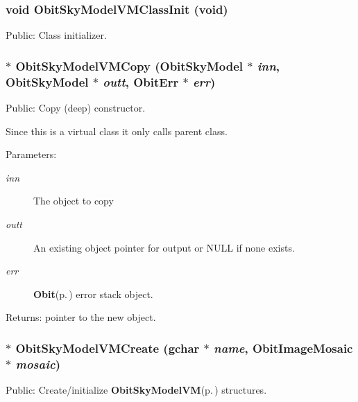 \subsubsection{\setlength{\rightskip}{0pt plus 5cm}void Obit\-Sky\-Model\-VMClass\-Init (void)}\label{ObitSkyModelVM_8h_a4}


Public: Class initializer. 

\subsubsection{$\ast$ Obit\-Sky\-Model\-VMCopy ({\bf Obit\-Sky\-Model} $\ast$ {\em inn}, {\bf Obit\-Sky\-Model} $\ast$ {\em outt}, {\bf Obit\-Err} $\ast$ {\em err})}\label{ObitSkyModelVM_8h_a12}


Public: Copy (deep) constructor. 

Since this is a virtual class it only calls parent class. \begin{Desc}
\item[Parameters:]
\begin{description}
\item[{\em inn}]The object to copy \item[{\em outt}]An existing object pointer for output or NULL if none exists. \item[{\em err}]{\bf Obit}{\rm (p.\,\pageref{structObit})} error stack object. \end{description}
\end{Desc}
\begin{Desc}
\item[Returns:]pointer to the new object. \end{Desc}
\subsubsection{$\ast$ Obit\-Sky\-Model\-VMCreate (gchar $\ast$ {\em name}, {\bf Obit\-Image\-Mosaic} $\ast$ {\em mosaic})}\label{ObitSkyModelVM_8h_a6}


Public: Create/initialize {\bf Obit\-Sky\-Model\-VM}{\rm (p.\,\pageref{structObitSkyModelVM})} structures. 

